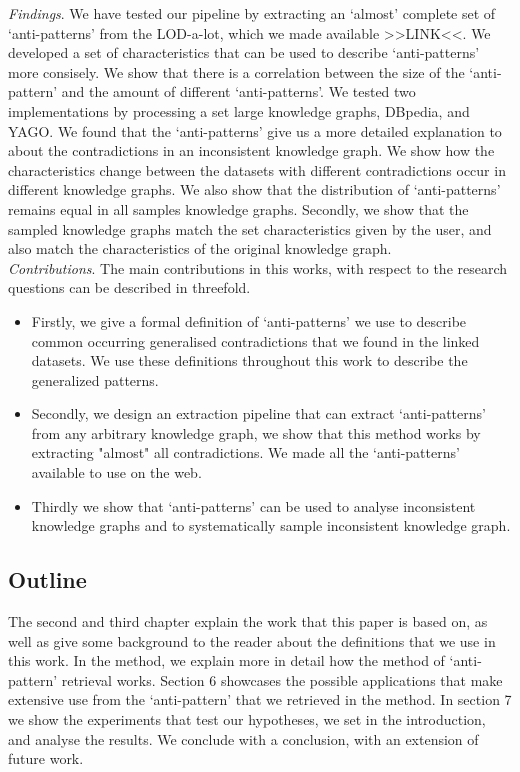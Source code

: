 \documentclass{article}
\begin{document}
\textit{Findings}. We have tested our pipeline by extracting an `almost' complete set of `anti-patterns' from the LOD-a-lot\cite{JavierD:2017}, which we made available >>LINK<<. We developed a set of characteristics that can be used to describe `anti-patterns' more consisely. 
We show that there is a correlation between the size of the `anti-pattern' and the amount of different `anti-patterns'. 
We tested two implementations by processing a set large knowledge graphs, DBpedia\cite{DBpedia}, and YAGO\cite{YAGO}.
We found that the `anti-patterns' give us a more detailed explanation to about the contradictions in an inconsistent knowledge graph. 
We show how the characteristics change between the datasets with different contradictions occur in different knowledge graphs. We also show that the  distribution of `anti-patterns' remains equal in all samples knowledge graphs. 
Secondly, we show that the sampled knowledge graphs match the set characteristics given by the user, and also match the characteristics of the original knowledge graph.\\

\textit{Contributions}. 
The main contributions in this works, with respect to the research questions can be described in threefold.
\begin{itemize}
	\item Firstly, we give a formal definition of `anti-patterns' we use to describe common occurring generalised contradictions that we found in the linked datasets. We use these definitions throughout this work to describe the generalized patterns.
	\item Secondly, we design an extraction pipeline that can extract `anti-patterns' from any arbitrary knowledge graph, we show that this method works by extracting "almost" all contradictions. We made all the `anti-patterns' available to use on the web.
	\item Thirdly we show that `anti-patterns' can be used to analyse inconsistent knowledge graphs and to systematically sample inconsistent knowledge graph.
\end{itemize}

\subsection{Outline}
 The second and third chapter explain the work that this paper is based on, as well as give some background to the reader about the definitions that we use in this work. In the method, we explain more in detail how the method of `anti-pattern' retrieval works. Section 6  showcases the possible applications that make extensive use from the `anti-pattern' that we retrieved in the method. In section 7 we show the experiments that test our hypotheses, we set in the introduction, and analyse the results. We conclude with a conclusion, with an extension of future work.
\end{document}
